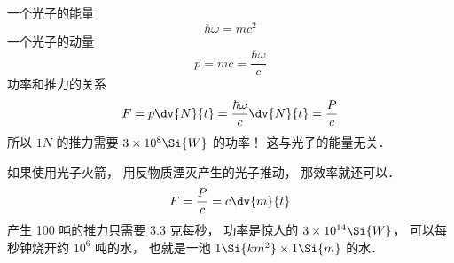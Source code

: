 
一个光子的能量
\begin{equation}
\hbar\omega = mc^2
\end{equation}
一个光子的动量
\begin{equation}
p = mc = \frac{\hbar\omega}{c}
\end{equation}
功率和推力的关系
\begin{equation}
F = p \dv{N}{t} = \frac{\hbar\omega}{c}\dv{N}{t} = \frac{P}{c}
\end{equation}
所以 $1N$ 的推力需要 $3\times 10^8\Si{W}$ 的功率！ 这与光子的能量无关．

如果使用光子火箭， 用反物质湮灭产生的光子推动， 那效率就还可以．
\begin{equation}
F = \frac{P}{c} = c\dv{m}{t}
\end{equation}
产生 100 吨的推力只需要 3.3 克每秒， 功率是惊人的 $3\times 10^{14}\Si{W}$， 可以每秒钟烧开约 $10^6$ 吨的水， 也就是一池 $1\Si{km^2} \times 1\Si{m}$ 的水．
